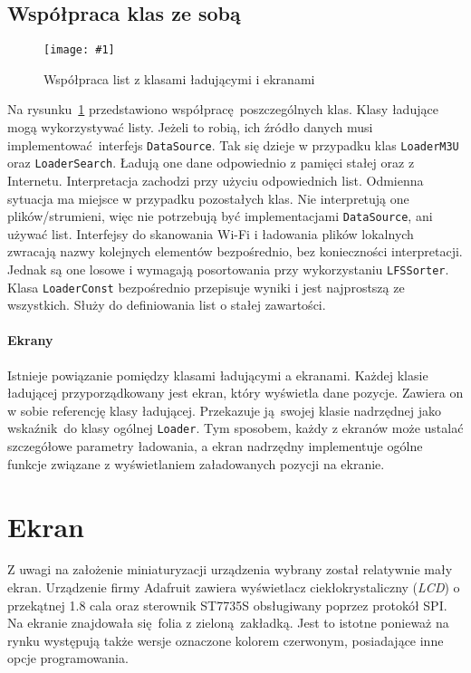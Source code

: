 \documentclass[polish]{aghengthesis}
\newcommand{\imgint}[4]{
	\begin{figure}[{#4}]
		\centering
		\texttt{[image: \#1]}
		\caption{#2}
		\label{#1}
	\end{figure}
}
\newcommand{\imgh}[3]{\imgint{#1}{#2}{#3}{H}}
\begin{document}
		\subsection{Współpraca klas ze sobą}
			\imgh{3/PicoRadio-loaders}{Współpraca list z klasami ładującymi i ekranami}{0.95}
			Na rysunku~\ref{3/PicoRadio-loaders} przedstawiono współpracę poszczególnych klas. Klasy ładujące mogą wykorzystywać listy. Jeżeli to robią, ich źródło danych musi implementować interfejs \lstinline|DataSource|. Tak się dzieje w przypadku klas \lstinline|LoaderM3U| oraz \lstinline|LoaderSearch|. Ładują one dane odpowiednio z pamięci stałej oraz z Internetu. Interpretacja zachodzi przy użyciu odpowiednich list. Odmienna sytuacja ma miejsce w przypadku pozostałych klas. Nie interpretują one plików/strumieni, więc nie potrzebują być implementacjami \lstinline|DataSource|, ani używać list. Interfejsy do skanowania Wi-Fi i ładowania plików lokalnych zwracają nazwy kolejnych elementów bezpośrednio, bez konieczności interpretacji. Jednak są one losowe i wymagają posortowania przy wykorzystaniu \lstinline|LFSSorter|. Klasa \lstinline|LoaderConst| bezpośrednio przepisuje wyniki i jest najprostszą ze wszystkich. Służy do definiowania list o stałej zawartości.
			
			\paragraph{Ekrany}
				Istnieje powiązanie pomiędzy klasami ładującymi a ekranami. Każdej klasie ładującej przyporządkowany jest ekran, który wyświetla dane pozycje. Zawiera on w sobie referencję klasy ładującej. Przekazuje ją swojej klasie nadrzędnej jako wskaźnik do klasy ogólnej \lstinline|Loader|. Tym sposobem, każdy z ekranów może ustalać szczegółowe parametry ładowania, a ekran nadrzędny implementuje ogólne funkcje związane z wyświetlaniem załadowanych pozycji na ekranie.
	
	\section{Ekran}
		\label{sec:screen}
		Z uwagi na założenie miniaturyzacji urządzenia wybrany został relatywnie mały ekran. Urządzenie firmy Adafruit zawiera wyświetlacz ciekłokrystaliczny (\textit{LCD}) o przekątnej 1.8 cala oraz sterownik ST7735S obsługiwany poprzez protokół SPI. Na ekranie znajdowała się folia z zieloną zakładką. Jest to istotne ponieważ na rynku występują także wersje oznaczone kolorem czerwonym, posiadające inne opcje programowania.
		$ $\\
		
\end{document}
